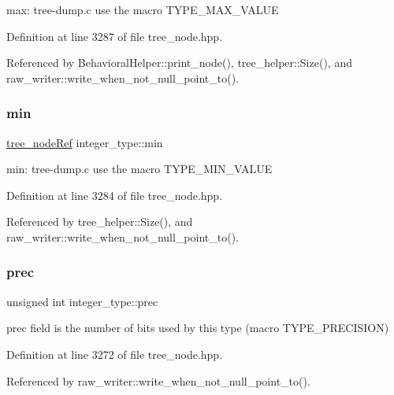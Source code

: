 max\+: tree-\/dump.\+c use the macro T\+Y\+P\+E\+\_\+\+M\+A\+X\+\_\+\+V\+A\+L\+UE 



Definition at line 3287 of file tree\+\_\+node.\+hpp.



Referenced by Behavioral\+Helper\+::print\+\_\+node(), tree\+\_\+helper\+::\+Size(), and raw\+\_\+writer\+::write\+\_\+when\+\_\+not\+\_\+null\+\_\+point\+\_\+to().

\mbox{\label{structinteger__type_aa20c7b9a0e31604abba7c9c6ab9e3c85}} 
\subsubsection{\texorpdfstring{min}{min}}
{\footnotesize\ttfamily \hyperlink{tree__node_8hpp_a6ee377554d1c4871ad66a337eaa67fd5}{tree\+\_\+node\+Ref} integer\+\_\+type\+::min}



min\+: tree-\/dump.\+c use the macro T\+Y\+P\+E\+\_\+\+M\+I\+N\+\_\+\+V\+A\+L\+UE 



Definition at line 3284 of file tree\+\_\+node.\+hpp.



Referenced by tree\+\_\+helper\+::\+Size(), and raw\+\_\+writer\+::write\+\_\+when\+\_\+not\+\_\+null\+\_\+point\+\_\+to().

\mbox{\label{structinteger__type_a2ef406fca15b8099f36caa9e7af56a8f}} 
\subsubsection{\texorpdfstring{prec}{prec}}
{\footnotesize\ttfamily unsigned int integer\+\_\+type\+::prec}



prec field is the number of bits used by this type (macro T\+Y\+P\+E\+\_\+\+P\+R\+E\+C\+I\+S\+I\+ON) 



Definition at line 3272 of file tree\+\_\+node.\+hpp.



Referenced by raw\+\_\+writer\+::write\+\_\+when\+\_\+not\+\_\+null\+\_\+point\+\_\+to().

